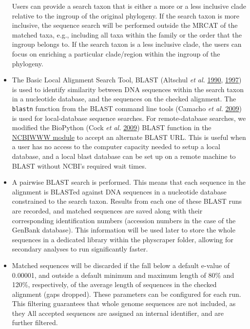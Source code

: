 \documentclass[]{article}
\begin{document}
\begin{itemize}
  Users can provide a search taxon that is either a more or a less inclusive
  clade relative to the ingroup of the original phylogeny. If the search taxon is more inclusive, the sequence search will be performed outside the MRCAT of the matched taxa, e.g., including all taxa within
  the family or the order that the ingroup belongs to. If the search taxon is a less inclusive clade, the users can focus on enriching a particular clade/region within the ingroup of the phylogeny.
\item
  The Basic Local Alignment Search Tool, BLAST (Altschul \emph{et al.} \protect\hyperlink{ref-altschul1990basic}{1990}, \protect\hyperlink{ref-altschul1997gapped}{1997}) is used to identify
  similarity between DNA sequences within the search taxon in a nucleotide
  database, and the sequences on the checked alignment.
  The \texttt{blastn} function from the BLAST command line tools (Camacho \emph{et al.} \protect\hyperlink{ref-camacho2009blast}{2009}) is used for local-database sequence searches.
  For remote-database searches, we modified the BioPython (Cock \emph{et al.} \protect\hyperlink{ref-cock2009biopython}{2009}) BLAST function in the \href{https://biopython.org/DIST/docs/api/Bio.Blast.NCBIWWW-module.html}{NCBIWWW module} to accept an alternate BLAST URL. This is useful when a user has no access to the computer capacity needed to setup a local database, and a local blast database can be set up on a remote machine to BLAST without NCBI's required wait times.
\item
  A pairwise BLAST search is performed. This means that each sequence
  in the alignment is BLASTed against DNA sequences in a nucleotide database constrained to the search
  taxon. Results from each one of these BLAST runs are recorded, and matched sequences are saved
  along with their corresponding identification numbers (accession numbers in the case of the GenBank database). This information will be used later to store the whole sequences in a dedicated library within the physcraper folder, allowing for secondary analyses to run significantly faster.
\item
  Matched sequences will be discarded if the fall below a default e-value of 0.00001, and outside a default minimum and maximum length of 80\% and 120\%, respectively, of the average length of sequences in the checked alignment (gaps dropped).
  These parameters can be configured for each run.
  This filtering guarantees that whole genome sequences are not included, as they
  All accepted sequences are assigned an internal identifier, and are further filtered.

\end{itemize}
\end{document}
